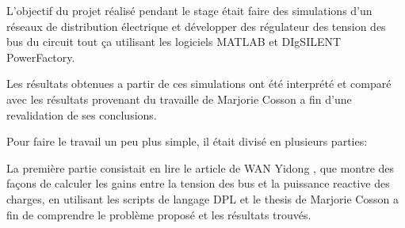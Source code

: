 L'objectif du projet réalisé pendant le stage était faire des simulations d'un réseaux de distribution électrique et développer des régulateur des tension des bus du circuit tout ça utilisant les logiciels MATLAB et DIgSILENT PowerFactory.

Les résultats obtenues a partir de ces simulations ont été interprété et comparé avec les résultats provenant du travaille de Marjorie Cosson \cite{cosson:tel-01374469} a fin d'une revalidation de ses conclusions.   

Pour faire le travail un peu plus simple, il était divisé en plusieurs parties:

La première partie consistait en lire le article de WAN Yidong \cite{yidong}, que montre des façons de calculer les gains entre la tension des bus et la puissance reactive des charges, en utilisant les scripts de langage \gls{DPL}     et le thesis de Marjorie Cosson \cite{cosson:tel-01374469} a fin de comprendre le problème proposé et les résultats trouvés. 

